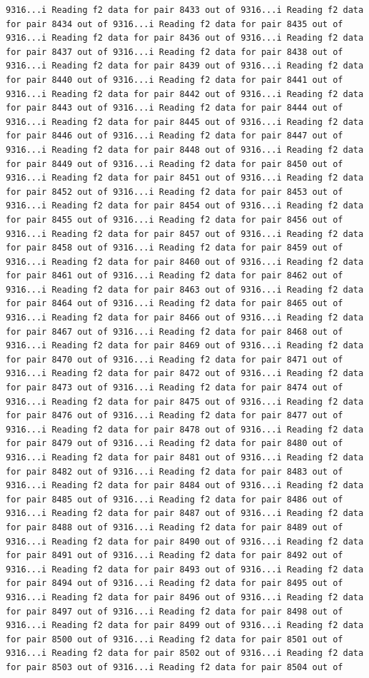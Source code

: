 \documentclass[
]{article}
\begin{document}
\begin{verbatim}
9316...i Reading f2 data for pair 8433 out of 9316...i Reading f2 data for pair 8434 out of 9316...i Reading f2 data for pair 8435 out of 9316...i Reading f2 data for pair 8436 out of 9316...i Reading f2 data for pair 8437 out of 9316...i Reading f2 data for pair 8438 out of 9316...i Reading f2 data for pair 8439 out of 9316...i Reading f2 data for pair 8440 out of 9316...i Reading f2 data for pair 8441 out of 9316...i Reading f2 data for pair 8442 out of 9316...i Reading f2 data for pair 8443 out of 9316...i Reading f2 data for pair 8444 out of 9316...i Reading f2 data for pair 8445 out of 9316...i Reading f2 data for pair 8446 out of 9316...i Reading f2 data for pair 8447 out of 9316...i Reading f2 data for pair 8448 out of 9316...i Reading f2 data for pair 8449 out of 9316...i Reading f2 data for pair 8450 out of 9316...i Reading f2 data for pair 8451 out of 9316...i Reading f2 data for pair 8452 out of 9316...i Reading f2 data for pair 8453 out of 9316...i Reading f2 data for pair 8454 out of 9316...i Reading f2 data for pair 8455 out of 9316...i Reading f2 data for pair 8456 out of 9316...i Reading f2 data for pair 8457 out of 9316...i Reading f2 data for pair 8458 out of 9316...i Reading f2 data for pair 8459 out of 9316...i Reading f2 data for pair 8460 out of 9316...i Reading f2 data for pair 8461 out of 9316...i Reading f2 data for pair 8462 out of 9316...i Reading f2 data for pair 8463 out of 9316...i Reading f2 data for pair 8464 out of 9316...i Reading f2 data for pair 8465 out of 9316...i Reading f2 data for pair 8466 out of 9316...i Reading f2 data for pair 8467 out of 9316...i Reading f2 data for pair 8468 out of 9316...i Reading f2 data for pair 8469 out of 9316...i Reading f2 data for pair 8470 out of 9316...i Reading f2 data for pair 8471 out of 9316...i Reading f2 data for pair 8472 out of 9316...i Reading f2 data for pair 8473 out of 9316...i Reading f2 data for pair 8474 out of 9316...i Reading f2 data for pair 8475 out of 9316...i Reading f2 data for pair 8476 out of 9316...i Reading f2 data for pair 8477 out of 9316...i Reading f2 data for pair 8478 out of 9316...i Reading f2 data for pair 8479 out of 9316...i Reading f2 data for pair 8480 out of 9316...i Reading f2 data for pair 8481 out of 9316...i Reading f2 data for pair 8482 out of 9316...i Reading f2 data for pair 8483 out of 9316...i Reading f2 data for pair 8484 out of 9316...i Reading f2 data for pair 8485 out of 9316...i Reading f2 data for pair 8486 out of 9316...i Reading f2 data for pair 8487 out of 9316...i Reading f2 data for pair 8488 out of 9316...i Reading f2 data for pair 8489 out of 9316...i Reading f2 data for pair 8490 out of 9316...i Reading f2 data for pair 8491 out of 9316...i Reading f2 data for pair 8492 out of 9316...i Reading f2 data for pair 8493 out of 9316...i Reading f2 data for pair 8494 out of 9316...i Reading f2 data for pair 8495 out of 9316...i Reading f2 data for pair 8496 out of 9316...i Reading f2 data for pair 8497 out of 9316...i Reading f2 data for pair 8498 out of 9316...i Reading f2 data for pair 8499 out of 9316...i Reading f2 data for pair 8500 out of 9316...i Reading f2 data for pair 8501 out of 9316...i Reading f2 data for pair 8502 out of 9316...i Reading f2 data for pair 8503 out of 9316...i Reading f2 data for pair 8504 out of 
\end{verbatim}
\end{document}
